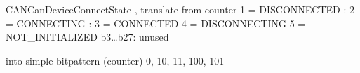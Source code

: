 \documentclass[a4paper,10pt,english]{sphinxmanual}
\begin{document}
\begin{fulllineitems}
\begin{fulllineitems}
\begin{description}
\begin{itemize}
\end{itemize}

\end{description}


\end{fulllineitems}


\begin{fulllineitems}
\label{\detokenize{classestracing:_CPPv4N10AnaCanScan13getPortStatusEv}}%
\pysigstartmultiline
{}%
\pysigstopmultiline
CANCanDeviceConnectState , translate from counter 1 = DISCONNECTED : 2 = CONNECTING : 3 = CONNECTED 4 = DISCONNECTING 5 = NOT\_INITIALIZED b3…b27: unused

into simple bitpattern (counter) 0, 10, 11, 100, 101 

\end{fulllineitems}


\end{fulllineitems}

\end{document}
